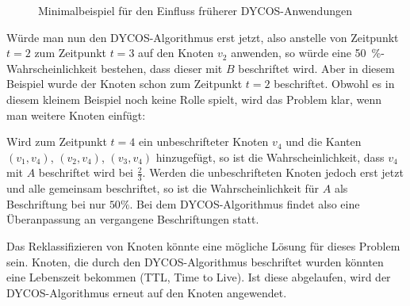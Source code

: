 \begin{figure}[ht]
    \centering
    \subfloat[$t=1$]{
        
        \label{fig:graph-t1}
    }%
    \subfloat[$t=2$]{
        
        \label{fig:graph-t2}
    }

    \subfloat[$t=3$]{
        
        \label{fig:graph-t3}
    }%
    \subfloat[$t=4$]{
        
        \label{fig:graph-t4}
    }%
    \caption{Minimalbeispiel für den Einfluss früherer DYCOS-Anwendungen}
    \label{fig:Formen}
\end{figure}

Würde man nun den DYCOS-Algorithmus erst jetzt, also anstelle von Zeitpunkt
$t=2$ zum Zeitpunkt $t=3$ auf den Knoten $v_2$ anwenden, so würde eine
\SI{50}{\percent}-Wahrscheinlichkeit bestehen, dass dieser mit $B$ beschriftet
wird. Aber in diesem Beispiel wurde der Knoten schon zum Zeitpunkt $t=2$
beschriftet. Obwohl es in diesem kleinem Beispiel noch keine Rolle spielt, wird
das Problem klar, wenn man weitere Knoten einfügt:

Wird zum Zeitpunkt $t=4$ ein unbeschrifteter Knoten $v_4$ und die Kanten
$(v_1, v_4)$, $(v_2, v_4)$, $(v_3, v_4)$ hinzugefügt, so ist die
Wahrscheinlichkeit, dass $v_4$ mit $A$ beschriftet wird bei $\frac{2}{3}$.
Werden die unbeschrifteten Knoten jedoch erst jetzt und alle gemeinsam
beschriftet, so ist die Wahrscheinlichkeit für $A$ als Beschriftung bei nur $50\%$.
Bei dem DYCOS-Algorithmus findet also eine Überanpassung an vergangene
Beschriftungen statt.

Das Reklassifizieren von Knoten könnte eine mögliche Lösung für dieses
Problem sein. Knoten, die durch den DYCOS-Algorithmus beschriftet wurden
könnten eine Lebenszeit bekommen (TTL, Time to Live). Ist diese
abgelaufen, wird der DYCOS-Algorithmus erneut auf den Knoten angewendet.
